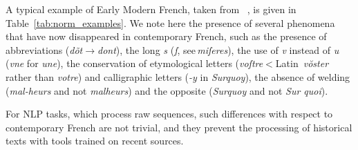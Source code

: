 A typical example of Early Modern French, taken from ~, is given in Table~\ref{tab:norm_examples}. We note here the presence of several phenomena that have now disappeared in contemporary French, such as the presence of abbreviations (\emph{dõt}$\to$\emph{dont}), the long \emph{s} (\emph{ſ}, see\,\emph{miſeres}), the use of \emph{v} instead of \emph{u} (\emph{vne} for \emph{une}), the conservation of etymological letters (\emph{voſtre}$<$Latin~\emph{vŏster} rather than \emph{votre}) and calligraphic letters (\emph{-y} in \emph{Surquoy}), the absence of welding  (\emph{\mbox{mal-heurs}} and not \emph{malheurs}) and the opposite (\emph{Surquoy} and not \emph{Sur quoi}).

For NLP tasks, which process raw sequences, such differences with respect to contemporary French are not trivial, and they prevent the processing of historical texts with tools trained on recent sources.